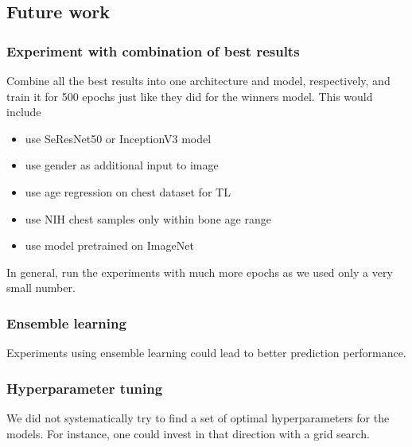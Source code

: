 \documentclass[10pt,twocolumn,letterpaper]{article}
\begin{document}
\subsection{Future work}
\subsubsection{Experiment with combination of best results}
Combine all the best results into one architecture and model, respectively, and train it for 500 epochs just like they did for the winners model. This would include 
\begin{itemize}
\item use SeResNet50 or InceptionV3 model
\item use gender as additional input to image
\item use age regression on chest dataset for TL
\item use NIH chest samples only within bone age range
\item use model pretrained on ImageNet
\end{itemize}

In general, run the experiments with much more epochs as we used only a very small number.

\subsubsection{Ensemble learning}
Experiments using ensemble learning could lead to better prediction performance.

\subsubsection{Hyperparameter tuning}
We did not systematically try to find a set of optimal hyperparameters for the models. For instance, one could invest in that direction with a grid search.

\printbibliography
\end{document}
